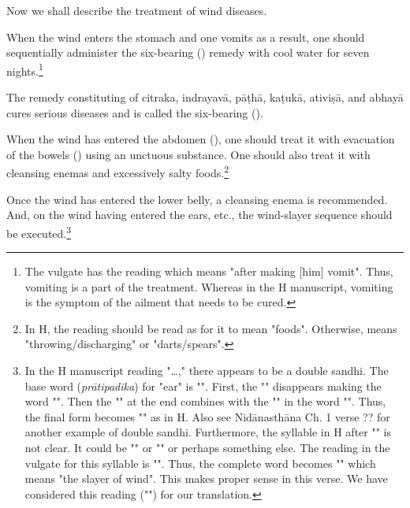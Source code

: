 \begin{translation}
    
    \item [1] 
    Now we shall describe the treatment of wind diseases.
    
    \item [2]

    \item [3]
    When the wind enters the stomach and one vomits as a result, one should sequentially administer the six-bearing () remedy with cool water for seven nights.\footnote{The vulgate has the reading  which means "after making [him] vomit". Thus, vomiting is a part of the treatment. Whereas in the H manuscript, vomiting is the symptom of the ailment that needs to be cured.}

    \item [4]
    The remedy constituting of \gls{citraka}, \gls{indrayavā}, \gls{pāṭhā}, \gls{kaṭukā}, \gls{ativiṣā}, and \gls{abhayā} cures serious diseases and is called the six-bearing ().

    \item [5]
    When the wind has entered the abdomen (), one should treat it with evacuation of the bowels () using an unctuous substance. One should also treat it with cleansing enemas and excessively salty foods.\footnote{In H, the reading  should be read as  for it to mean "foods". Otherwise,  means "throwing/discharging" or "darts/spears".} 

    \item [6]
    Once the wind has entered the lower belly, a cleansing enema is recommended. And, on the wind having entered the ears, etc., the wind-slayer sequence should be executed.\footnote{In the H manuscript reading "\ldots," there appears to be a double sandhi. The base word (\emph{prātipadika}) for "ear" is "". First, the "" disappears making the word "". Then the "" at the end combines with the "" in the word "". Thus, the final form becomes "" as in H. Also see Nidānasthāna Ch. 1 verse ?? for another example of double sandhi.
    Furthermore, the syllable in H after "" is not clear. It could be "" or "" or perhaps something else. The reading in the vulgate for this syllable is "". Thus, the complete word becomes "" which means "the slayer of wind". This makes proper sense in this verse. We have considered this reading ("") for our translation.}    


\end{translation}
